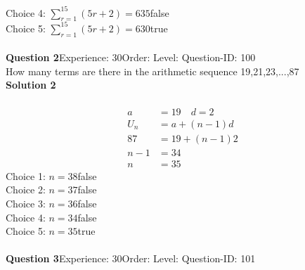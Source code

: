 \documentclass{article}
\begin{document}
Choice 4: \hspace{20pt}$\displaystyle\sum_{r=1}^{15} (5r+2)=635$\hspace{20pt}false\\
Choice 5: \hspace{20pt}$\displaystyle\sum_{r=1}^{15} (5r+2)=630$\hspace{20pt}true\\
\\[4pt]
\noindent\textbf{Question 2}\hspace{20pt}Experience: 30\hspace{20pt}Order: \hspace{20pt}Level: \hspace{20pt}Question-ID: 100\\[2pt]
How many terms are there in the arithmetic sequence 19,21,23,...,87\\[4pt]
\noindent\textbf{Solution 2}\\[2pt]
\\[-35pt]\begin{align*}
a&=19 \quad d=2\\[2pt]
U_n&=a+(n-1)d\\[2pt]
87&=19+(n-1)2\\[2pt]
n-1&=34\\[2pt]
n&=35
\end{align*}
Choice 1: \hspace{20pt}$n=38$\hspace{20pt}false\\
Choice 2: \hspace{20pt}$n=37$\hspace{20pt}false\\
Choice 3: \hspace{20pt}$n=36$\hspace{20pt}false\\
Choice 4: \hspace{20pt}$n=34$\hspace{20pt}false\\
Choice 5: \hspace{20pt}$n=35$\hspace{20pt}true\\
\\[4pt]
\noindent\textbf{Question 3}\hspace{20pt}Experience: 30\hspace{20pt}Order: \hspace{20pt}Level: \hspace{20pt}Question-ID: 101\\[2pt]
\end{document}
